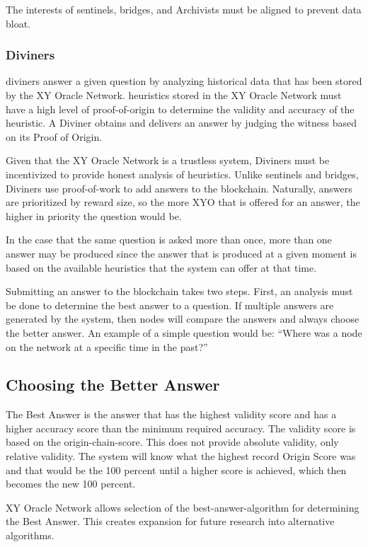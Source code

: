 \documentclass{article}
\begin{document}
The interests of \Glspl{sentinel}, \Glspl{bridge}, and Archivists must be aligned to prevent data bloat.

\subsubsection {Diviners}
\Glspl{diviner} answer a given question by analyzing historical data that has been stored by the XY Oracle Network. \Glspl{heuristic} stored in the XY Oracle Network must have a high level of \Gls{proof-of-origin} to determine the validity and \gls{accuracy} of the heuristic. A Diviner obtains and delivers an answer by judging the witness based on its Proof of Origin.

Given that the XY Oracle Network is a trustless system, Diviners must be incentivized to provide honest analysis of heuristics. Unlike \Glspl{sentinel} and \Glspl{bridge}, Diviners use \Gls{proof-of-work} to add answers to the blockchain. Naturally, answers are prioritized by reward size, so the more XYO that is offered for an answer, the higher in priority the question would be.

In the case that the same question is asked more than once, more than one answer may be produced since the answer that is produced at a given moment is based on the available heuristics that the system can offer at that time.

Submitting an answer to the blockchain takes two steps. First, an analysis must be done to determine the best answer to a question. If multiple answers are generated by the system, then nodes will compare the answers and always choose the better answer. An example of a simple question would be: ``Where was a node on the network at a specific time in the past?''

\subsection {Choosing the Better Answer}
The Best Answer is the answer that has the highest validity score and has a higher \gls{accuracy} score than the minimum required accuracy. The validity score is based on the \Gls{origin-chain-score}. This does not provide absolute validity, only relative validity. The system will know what the highest record Origin Score was and that would be the 100 percent until a higher score is achieved, which then becomes the new 100 percent.

XY Oracle Network allows selection of the \Gls{best-answer-algorithm} for determining the Best Answer. This creates expansion for future research into alternative algorithms.
\end{document}
